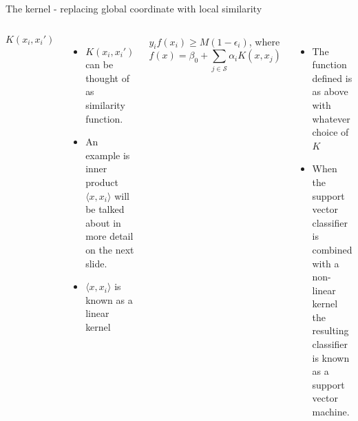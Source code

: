 \documentclass[aspectratio=169,usenames,dvipsnames]{beamer}
\newcommand{\InstructorList}[1]{
\begin{itemize}
	\color{orange}
	#1
\end{itemize}
}
\begin{document}
\begin{frame}[t]{The kernel - replacing global coordinate with local similarity}

\begin{columns}
\centering
\begin{equation*}
	K(x_i,x_i')
\end{equation*}
\InstructorList{
	\item $K(x_i,x_i')$ can be thought of as similarity function.
  	\item An example is inner product $\langle x, x_i \rangle$ will be talked about in more detail on the next slide.
	\item $\langle x, x_i \rangle$ is known as a linear kernel
}

\centering
$y_i f(x_i)\geq M(1-\epsilon_i)$, where
\begin{equation*}
	f(x) = \beta_0 + \sum_{j \in \mathcal{S}}\alpha_i K(x,x_j)
\end{equation*}

\InstructorList{
  \item The function defined is as above with whatever choice of $K$
  
	\item When the support vector classifier is combined with a non-linear kernel the resulting classifier is 	known as a support vector machine.
}

\end{columns}

\end{frame}

\end{document}
